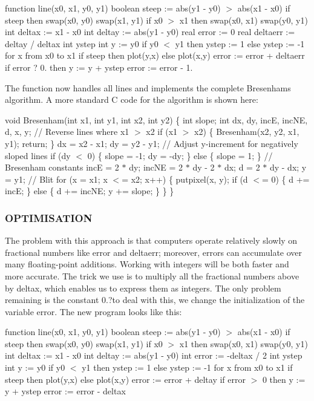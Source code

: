 function line(x0, x1, y0, y1) boolean steep \+:= abs(y1 -\/ y0) $>$ abs(x1 -\/ x0) if steep then swap(x0, y0) swap(x1, y1) if x0 $>$ x1 then swap(x0, x1) swap(y0, y1) int deltax \+:= x1 -\/ x0 int deltay \+:= abs(y1 -\/ y0) real error \+:= 0 real deltaerr \+:= deltay / deltax int ystep int y \+:= y0 if y0 $<$ y1 then ystep \+:= 1 else ystep \+:= -\/1 for x from x0 to x1 if steep then plot(y,x) else plot(x,y) error \+:= error + deltaerr if error ? 0. then y \+:= y + ystep error \+:= error -\/ 1.

The function now handles all lines and implements the complete Bresenham\textquotesingle{}s algorithm. A more standard C code for the algorithm is shown here\+:

void Bresenham(int x1, int y1, int x2, int y2) \{ int slope; int dx, dy, incE, inc\+NE, d, x, y; // Reverse lines where x1 $>$ x2 if (x1 $>$ x2) \{ Bresenham(x2, y2, x1, y1); return; \} dx = x2 -\/ x1; dy = y2 -\/ y1; // Adjust y-\/increment for negatively sloped lines if (dy $<$ 0) \{ slope = -\/1; dy = -\/dy; \} else \{ slope = 1; \} // Bresenham constants incE = 2 $\ast$ dy; inc\+NE = 2 $\ast$ dy -\/ 2 $\ast$ dx; d = 2 $\ast$ dy -\/ dx; y = y1; // Blit for (x = x1; x $<$= x2; x++) \{ putpixel(x, y); if (d $<$= 0) \{ d += incE; \} else \{ d += inc\+NE; y += slope; \} \} \}

\subsubsection*{O\+P\+T\+I\+M\+I\+S\+A\+T\+I\+ON}

The problem with this approach is that computers operate relatively slowly on fractional numbers like error and deltaerr; moreover, errors can accumulate over many floating-\/point additions. Working with integers will be both faster and more accurate. The trick we use is to multiply all the fractional numbers above by deltax, which enables us to express them as integers. The only problem remaining is the constant 0.?to deal with this, we change the initialization of the variable error. The new program looks like this\+:

function line(x0, x1, y0, y1) boolean steep \+:= abs(y1 -\/ y0) $>$ abs(x1 -\/ x0) if steep then swap(x0, y0) swap(x1, y1) if x0 $>$ x1 then swap(x0, x1) swap(y0, y1) int deltax \+:= x1 -\/ x0 int deltay \+:= abs(y1 -\/ y0) int error \+:= -\/deltax / 2 int ystep int y \+:= y0 if y0 $<$ y1 then ystep \+:= 1 else ystep \+:= -\/1 for x from x0 to x1 if steep then plot(y,x) else plot(x,y) error \+:= error + deltay if error $>$ 0 then y \+:= y + ystep error \+:= error -\/ deltax


